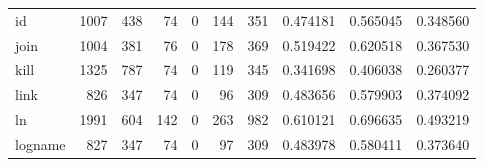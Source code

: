 \begin{tabular}{lrrrrrrrrr}
id        &                                1007 &                                             438 &                                             74 &                                             0 &                                            144 &                                          351 &                                           0.474181 &                               0.565045 &                             0.348560 \\
join      &                                1004 &                                             381 &                                             76 &                                             0 &                                            178 &                                          369 &                                           0.519422 &                               0.620518 &                             0.367530 \\
kill      &                                1325 &                                             787 &                                             74 &                                             0 &                                            119 &                                          345 &                                           0.341698 &                               0.406038 &                             0.260377 \\
link      &                                 826 &                                             347 &                                             74 &                                             0 &                                             96 &                                          309 &                                           0.483656 &                               0.579903 &                             0.374092 \\
ln        &                                1991 &                                             604 &                                            142 &                                             0 &                                            263 &                                          982 &                                           0.610121 &                               0.696635 &                             0.493219 \\
logname   &                                 827 &                                             347 &                                             74 &                                             0 &                                             97 &                                          309 &                                           0.483978 &                               0.580411 &                             0.373640 \\

\end{tabular}
